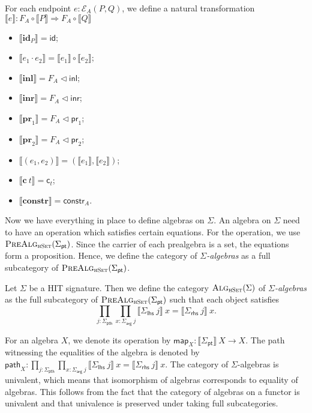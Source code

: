 \documentclass[9pt]{entcs}
\newcommand{\type}[1]{\textsc{#1}}
\newcommand{\constructor}[1]{\mathbf{#1}}
\newcommand{\category}[1]{\textsc{#1}}
\newcommand{\nattranstxt}[1]{\mathsf{#1}}
\newcommand{\function}[1]{\mathsf{#1}}
\newcommand{\deprod}[3]{\prod_{#1 : #2} #3} %
\newcommand{\hset}{\type{hSet}} %
\newcommand{\0}{\textbf{0}} %
\newcommand{\1}{\textbf{1}} %
\newcommand{\compf}[2]{#1 \circ #2} %
\newcommand{\nattrans}[2]{#1 \Longrightarrow #2} %
\newcommand{\ctrans}[1]{\nattranstxt{c}_{#1}} %
\newcommand{\constrt}[1]{\nattranstxt{constr}_{#1}} %
\newcommand{\idt}[1]{\nattranstxt{id}} %
\newcommand{\compt}[2]{#1 \circ #2} %
\newcommand{\lwhisker}[2]{#1 \vartriangleleft #2} %
\newcommand{\inlt}{\nattranstxt{inl}} %
\newcommand{\inrt}{\nattranstxt{inr}} %
\newcommand{\prlt}{\nattranstxt{pr}_1} %
\newcommand{\prrt}{\nattranstxt{pr}_2} %
\newcommand{\pairt}[2]{(#1 , #2)} %
\newcommand{\ep}[3]{\mathcal{E}_{#1}(#2,#3)} %
\newcommand{\id}[1]{\constructor{id}_{#1}} %
\newcommand{\comp}[2]{#1 \cdot #2} %
\newcommand{\inle}{\constructor{inl}} %
\newcommand{\inre}{\constructor{inr}} %
\newcommand{\prle}{\constructor{pr}_1} %
\newcommand{\prre}{\constructor{pr}_2} %
\newcommand{\pair}[2]{(#1 , #2)} %
\newcommand{\Ce}{\constructor{c}} %
\newcommand{\constr}{\constructor{constr}} %
\newcommand{\pt}[0]{\textsf{pt}}
\newcommand{\pthI}[0]{\textsf{pth}}
\newcommand{\pthA}[0]{\textsf{arg}}
\newcommand{\pthlh}[0]{\textsf{lhs}}
\newcommand{\pthrh}[0]{\textsf{rhs}}
\newcommand{\pointc}[1]{#1_{\pt}} %
\newcommand{\pathI}[1]{#1_{\pthI}} %
\newcommand{\pathA}[1]{#1_{\pthA}} %
\newcommand{\pathlh}[1]{#1_{\pthlh}} %
\newcommand{\pathrh}[1]{#1_{\pthrh}} %
\newcommand{\semP}[1]{\llbracket #1 \rrbracket} %
\newcommand{\prealg}[1]{\category{PreAlg}_{\hset}(#1)} %
\newcommand{\forget}[1]{F_{#1}} %
\newcommand{\semE}[1]{\llbracket #1 \rrbracket} %
\newcommand{\Alg}[1]{\category{Alg}_{\hset}(#1)} %
\newcommand{\constrA}[1]{\function{map}_{#1}} %
\newcommand{\constrP}[1]{\function{path}_{#1}} %
\begin{document}
\begin{definition}
\label{def:semendpoint}
For each endpoint $e : \ep{A}{P}{Q}$, we define a natural transformation $\semE{e} : \nattrans{\compf{\forget{A}}{\semP{P}}} {\compf{\forget{A}}{\semP{Q}}}$
\begin{itemize}
	\item $\semE{\id{P}} = \idt{\compf{\forget{A}}{\semP{P}}}$;
	\item $\semE{\comp{e_1}{e_2}} = \compt{\semE{e_1}}{\semE{e_2}}$;
	\item $\semE{\inle} = \lwhisker{\forget{A}}{\inlt}$;
	\item $\semE{\inre} = \lwhisker{\forget{A}}{\inrt}$;
	\item $\semE{\prle} = \lwhisker{\forget{A}}{\prlt}$;
	\item $\semE{\prre} = \lwhisker{\forget{A}}{\prrt}$;
	\item $\semE{\pair{e_1}{e_2}} = \pairt{\semE{e_1}}{\semE{e_2}}$;
	\item $\semE{\Ce \> t} = \ctrans{t}$;
	\item $\semE{\constr} = \constrt{A}$.
\end{itemize}
\end{definition}

Now we have everything in place to define algebras on $\Sigma$.
An algebra on $\Sigma$ need to have an operation which satisfies certain equations.
For the operation, we use $\prealg{\pointc{\Sigma}}$.
Since the carrier of each prealgebra is a set, the equations form a proposition.
Hence, we define the category of \emph{$\Sigma$-algebras} as a full subcategory of $\prealg{\pointc{\Sigma}}$.

\begin{definition}
\label{def:algebra}
Let $\Sigma$ be a HIT signature.
Then we define the category $\Alg{\Sigma}$ of \emph{$\Sigma$-algebras} as the full subcategory of $\prealg{\pointc{\Sigma}}$ such that each object satisfies
\[
\deprod{j}{\pathI{\Sigma}}{\deprod{x}{\pathA{\Sigma} \> j}{\semE{\pathlh{\Sigma} \> j} \> x = \semE{\pathrh{\Sigma} \> j} \> x}}.
\]
\end{definition}

For an algebra $X$, we denote its operation by $\constrA{X} : \semP{\pointc{\Sigma}} \> X \rightarrow X$.
The path witnessing the equalities of the algebra is denoted by $\constrP{X} : \deprod{j}{\pathI{\Sigma}}{\deprod{x}{\pathA{\Sigma} \> j}{\semE{\pathlh{\Sigma} \> j} \> x = \semE{\pathrh{\Sigma} \> j} \> x}}$.
The category of $\Sigma$-algebras is univalent, which means that isomorphism of algebras corresponds to equality of algebras.
This follows from the fact that the category of algebras on a functor is univalent and that univalence is preserved under taking full subcategories.
\end{document}

